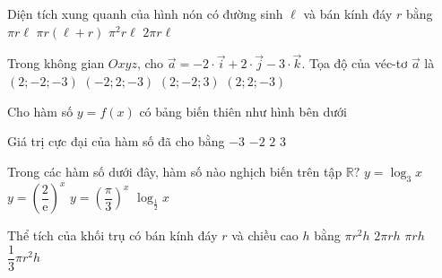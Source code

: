 \begin{ex}%
	Diện tích xung quanh của hình nón có đường sinh $\ell$ và bán kính đáy $r$ bằng	
	\choice
	{\True $\pi r\ell$}
	{$\pi r(\ell+r)$}
	{$\pi^2r\ell$}
	{$2\pi r\ell$}
\end{ex}

\begin{ex}%
	Trong không gian $Oxyz$, cho $\overrightarrow{a}=-2\cdot \overrightarrow{i}+2\cdot \overrightarrow{j}-3\cdot\overrightarrow{k}$. Tọa độ của véc-tơ $\overrightarrow{a}$ là	
	\choice
	{$(2;-2;-3)$}
	{\True $(-2;2;-3)$}
	{$(2;-2;3)$}
	{$(2;2;-3)$}
\end{ex}

\begin{ex}%
	Cho hàm số $y=f(x)$ có bảng biến thiên như hình bên dưới
	\begin{center}
	\end{center}
	Giá trị cực đại của hàm số đã cho bằng
	\choice
	{$-3$}
	{$-2$}
	{\True $2$}
	{$3$}
\end{ex}

\begin{ex}%
	Trong các hàm số dưới đây, hàm số nào nghịch biến trên tập $\mathbb{R}?$	
	\choice
	{$y=\log_3x$}
	{\True $y=\left(\dfrac{2}{\mathrm{e}}\right)^x$}
	{$y=\left(\dfrac{\pi}{3}\right)^x$}
	{$\log_{\frac{1}{2}}x$}
\end{ex}

\begin{ex}%
	Thể tích của khối trụ có bán kính đáy $r$ và chiều cao $h$ bằng	
	\choice
	{\True $\pi r^2 h$}
	{$2\pi rh$}
	{$\pi rh$}
	{ $\dfrac{1}{3}\pi r^2 h$}
\end{ex}


